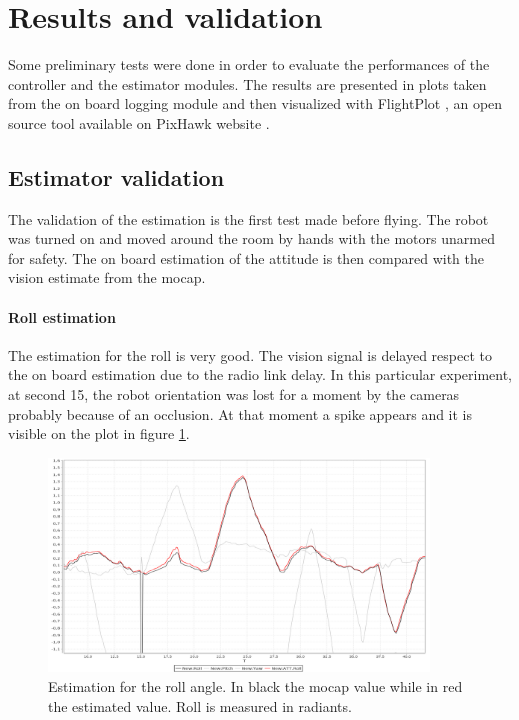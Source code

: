 \section{Results and validation}

Some preliminary tests were done in order to evaluate the performances of the controller and the estimator modules. The results are presented in plots taken from the on board logging module and then visualized with FlightPlot , an open source tool available on PixHawk website \cite{FPlot}.   

\subsection{Estimator validation}

The validation of the estimation is the first test made before flying. The robot was turned on and moved around the room by hands with the motors unarmed for safety. The on board estimation of the attitude is then compared with the vision estimate from the mocap. \\

\noindent
\paragraph{Roll estimation} 
The estimation for the roll is very good. The vision signal is delayed respect to the on board estimation due to the radio link delay. In this particular experiment, at second 15, the robot orientation was lost for a moment by the cameras probably because of an occlusion. At that moment a spike appears and it is visible on the plot in figure \ref{figure:rollesti}.
\begin{figure}[h]
	\centering
	\noindent
	\includegraphics[width=0.9\textwidth]{roll_esti.png}
	\caption[Roll estimation]{Estimation for the roll angle. In black the mocap value while in red the estimated value. Roll is measured in radiants.}
	\label{figure:rollesti}
\end{figure}

